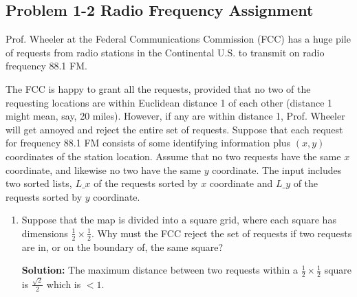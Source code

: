 \documentclass[12pt]{article}
\begin{document}
\subsection*{Problem 1-2 Radio Frequency Assignment}
\par{Prof. Wheeler at the Federal Communications Commission (FCC) has a huge pile of requests from radio stations in the Continental U.S. to transmit on radio frequency 88.1 FM.}
\par{The FCC is happy to grant all the requests, provided that no two of the requesting locations are within Euclidean distance 1 of each other (distance 1 might mean, say, 20 miles). However, if any are within distance 1, Prof. Wheeler will get annoyed and reject the entire set of requests. Suppose that each request for frequency 88.1 FM consists of some identifying information plus $(x, y)$ coordinates of the station location. Assume that no two requests have the same $x$ coordinate, and likewise no two have the same $y$ coordinate. The input includes two sorted lists, $L\_x$ of the requests sorted by $x$ coordinate and $L\_y$ of the requests sorted by $y$ coordinate.}
\begin{enumerate}
	\item Suppose that the map is divided into a square grid, where each square has dimensions $\frac{1}{2} \times \frac{1}{2}$. Why must the FCC reject the set of requests if two requests are in, or on the boundary of, the same square? \\
	\par{\textbf{Solution:} The maximum distance between two requests within a $\frac{1}{2} \times \frac{1}{2}$ square is $\frac{\sqrt{2}}{2}$ which is $< 1$.}
	
\end{enumerate}
\end{document}

